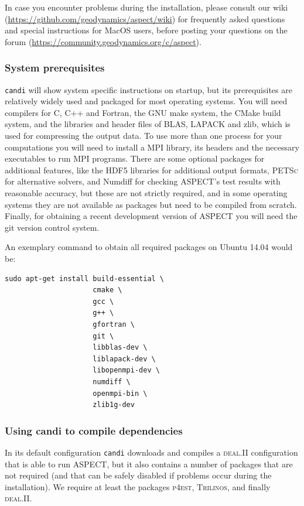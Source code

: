 \documentclass{article}
\newcommand{\dealii}{{\textsc{deal.II}}}
\newcommand{\pfrst}{{\normalfont\textsc{p4est}}}
\newcommand{\trilinos}{{\textsc{Trilinos}}}
\newcommand{\petsc}{{\textsc{PETSc}}}
\newcommand{\aspect}{\textsc{ASPECT}}
\begin{document}
In case you encounter problems during the installation, please consult our wiki
(\url{https://github.com/geodynamics/aspect/wiki}) for frequently asked
questions and special instructions for MacOS users, before posting your
questions on the forum (\url{https://community.geodynamics.org/c/aspect}).

\subsubsection{System prerequisites}

\texttt{candi} will show system specific instructions on startup, but its prerequisites
are relatively widely used and packaged
for most operating systems. You will need compilers for C, C++ and
Fortran, the GNU make system, the CMake build system, and the libraries and
header files of BLAS, LAPACK and zlib, which is used for compressing
the output data. To use more than one process for your computations
you will need to install a MPI library, its headers and the
necessary executables to run MPI programs. There are some optional packages
for additional features, like the HDF5 libraries for additional output formats,
\petsc{} for alternative solvers, and Numdiff for checking \aspect{}'s test
results with reasonable accuracy, but these are not strictly required, and in
some operating systems they are not available as packages but need to be
compiled from scratch.
Finally, for obtaining a recent development version of \aspect{} you will
need the git version control system.

An exemplary command to obtain all required packages on Ubuntu 14.04 would be:
\begin{verbatim}
sudo apt-get install build-essential \
                     cmake \
                     gcc \
                     g++ \
                     gfortran \
                     git \
                     libblas-dev \
                     liblapack-dev \
                     libopenmpi-dev \
                     numdiff \
                     openmpi-bin \
                     zlib1g-dev
\end{verbatim}

\subsubsection{Using candi to compile dependencies}

In its default configuration \texttt{candi} downloads and
compiles a \dealii{} configuration that is able to run \aspect, but it
also contains a number of packages that are not required (and that can
be safely disabled if problems occur during the
installation). We require at least the packages \pfrst{}, \trilinos{},
and finally \dealii{}.
\end{document}

